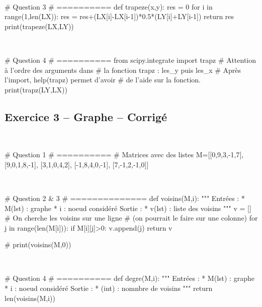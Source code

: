\documentclass[10pt,fleqn]{article} %
\begin{document}
\begin{multicols}{2}
\begin{corrige}
$\quad$
\begin{python}
# Question 3
# ==========
def trapeze(x,y):
    res = 0 
    for i in range(1,len(LX)):
        res = res+(LX[i]-LX[i-1])*0.5*(LY[i]+LY[i-1])
    return res
print(trapeze(LX,LY))
\end{python}
\end{corrige}

\begin{corrige}
$\quad$
\begin{python}
# Question 4
# ==========
from scipy.integrate import trapz
# Attention à l'ordre des arguments dans 
# la fonction trapz : les_y puis les_x
# Après l'import, help(trapz) permet d'avoir 
# de l'aide sur la fonction.
print(trapz(LY,LX))
\end{python}
\end{corrige}

\newpage

\subsection*{Exercice 3 -- Graphe -- Corrigé}

\begin{corrige}
$\quad$
\begin{python}
# Question 1
# ==========
# Matrices avec des listes
M=[[0,9,3,-1,7],
      [9,0,1,8,-1],
      [3,1,0,4,2],
      [-1,8,4,0,-1],
      [7,-1,2,-1,0]]
\end{python}
\end{corrige}

\begin{corrige}
$\quad$
\begin{python}
# Question 2 & 3
# ==============
def voisins(M,i):
    """
    Entrées : 
      * M(lst) : graphe
      * i : noeud considéré
    Sortie :
      * v(lst) : liste des voisins
    """
    v = []
    # On cherche les voisins sur une ligne 
    # (on pourrait le faire sur une colonne)
    for j in range(len(M[i])):
        if M[i][j]>0:
            v.append(j)
    return v
    
# print(voisins(M,0))
\end{python}
\end{corrige}


\begin{corrige}
$\quad$
\begin{python}
# Question 4
# ==========
def degre(M,i):
    """
    Entrées : 
      * M(lst) : graphe
      * i : noeud considéré
    Sortie :
      * (int) : nomnbre de voisins
    """
    return len(voisins(M,i))
\end{python}
\end{corrige}


\end{multicols}
\end{document}
